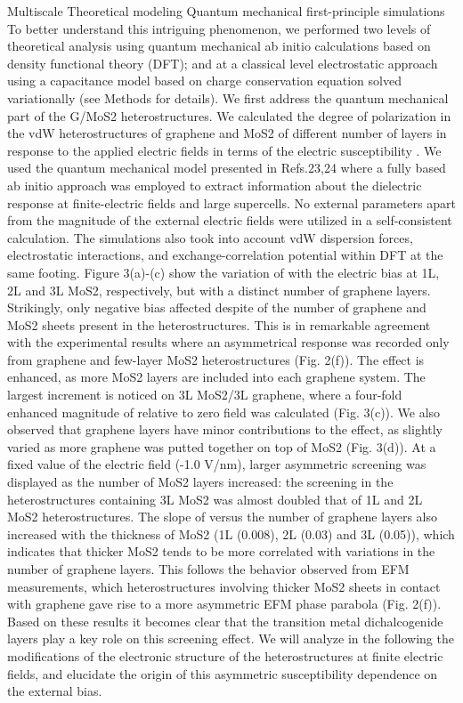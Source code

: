 Multiscale Theoretical modeling
Quantum mechanical first-principle simulations
To better understand this intriguing phenomenon, we performed two levels of theoretical analysis using quantum mechanical ab initio calculations based on density functional theory (DFT); and at a classical level electrostatic approach using a capacitance model based on charge conservation equation solved variationally (see Methods for details). We first address the quantum mechanical part of the G/MoS2 heterostructures. We calculated the degree of polarization in the vdW heterostructures of graphene and MoS2 of different number of layers in response to the applied electric fields in terms of the electric susceptibility  . We used the quantum mechanical model presented in Refs.23,24 where a fully based ab initio approach was employed to extract information about the dielectric response at finite-electric fields and large supercells. No external parameters apart from the magnitude of the external electric fields were utilized in a self-consistent calculation. The simulations also took into account vdW dispersion forces, electrostatic interactions, and exchange-correlation potential within DFT at the same footing. 
  	Figure 3(a)-(c) show the variation of   with the electric bias at 1L, 2L and 3L MoS2, respectively, but with a distinct number of graphene layers. Strikingly, only negative bias affected   despite of the number of graphene and MoS2 sheets present in the heterostructures. This is in remarkable agreement with the experimental results where an asymmetrical response was recorded only from graphene and few-layer MoS2 heterostructures (Fig. 2(f)). The effect is enhanced, as more MoS2 layers are included into each graphene system. The largest increment is noticed on 3L MoS2/3L graphene, where a four-fold enhanced magnitude of   relative to zero field was calculated (Fig. 3(c)). We also observed that graphene layers have minor contributions to the effect, as  slightly varied as more graphene was putted together on top of MoS2 (Fig. 3(d)). At a fixed value of the electric field (-1.0 V/nm), larger asymmetric screening was displayed as the number of MoS2 layers increased: the screening in the heterostructures containing 3L MoS2 was almost doubled that of 1L and 2L MoS2 heterostructures. The slope of   versus the number of graphene layers also increased with the thickness of MoS2 (1L (0.008), 2L (0.03) and 3L (0.05)), which indicates that thicker MoS2 tends to be more correlated with variations in the number of graphene layers. This follows the behavior observed from EFM measurements, which heterostructures involving thicker MoS2 sheets in contact with graphene gave rise to a more asymmetric EFM phase parabola (Fig. 2(f)). Based on these results it becomes clear that the transition metal dichalcogenide layers play a key role on this screening effect. We will analyze in the following the modifications of the electronic structure of the heterostructures at finite electric fields, and elucidate the origin of this asymmetric susceptibility dependence on the external bias. 
